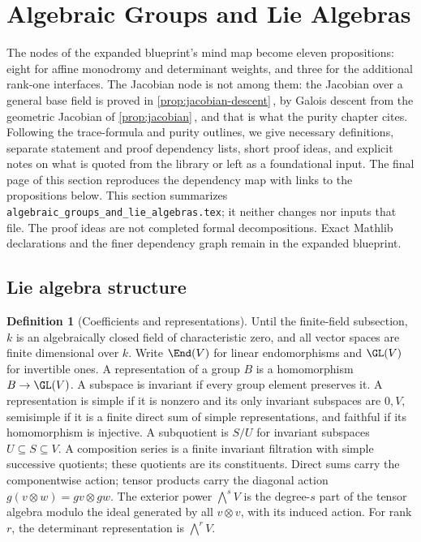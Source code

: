 \documentclass[11pt]{article}
\theoremstyle{plain}
\theoremstyle{definition}
\newtheorem{definition}[theorem]{Definition}
\newcommand{\Cref}[1]{\hyperref[#1]{\ref{#1}}\,\hyperref[#1]{\nameref*{#1}}}
\begin{document}
\section{Algebraic Groups and Lie Algebras}
\label{sec:algebraic-groups-lie-algebras}
\begin{abstract}
content: Lie algebra structure, algebraic monodromy, determinant weights,
and rank-one interfaces.
\\key results: the eleven map-node propositions below, from
Prop \ref{p:lie} to Prop \ref{p:rankone}; the remaining propositions are
the interfaces they rest on.
\\references: detailed blueprint
\end{abstract}

The nodes of the expanded blueprint's mind map become eleven
propositions: eight for affine monodromy and determinant weights, and
three for the additional rank-one interfaces. The Jacobian node is not
among them: the Jacobian over a general base field is proved in
\Cref{prop:jacobian-descent}, by Galois descent from the geometric
Jacobian of \Cref{prop:jacobian}, and that is what the purity chapter cites. Following the trace-formula
and purity outlines, we give necessary definitions, separate statement
and proof dependency lists, short proof ideas, and explicit notes on what
is quoted from the library or left as a foundational input. The final page of this section reproduces the dependency map with links to the
propositions below. This section summarizes
\texttt{algebraic\_groups\_and\_lie\_algebras.tex}; it neither changes
nor inputs that file. The proof ideas are not completed formal
decompositions. Exact Mathlib declarations and the finer dependency
graph remain in the expanded blueprint.

\subsection{Lie algebra structure}

\begin{definition}[Coefficients and representations]\label{d:linear}
Until the finite-field subsection, $k$ is an algebraically closed field of
characteristic zero, and all vector spaces are finite dimensional over
$k$. Write $\End(V)$ for linear endomorphisms and $\GL(V)$ for invertible
ones. A representation of a group $B$ is a homomorphism
$B\to\GL(V)$. A subspace is invariant if every group element preserves
it. A representation is simple if it is nonzero and its only invariant
subspaces are $0,V$, semisimple if it is a finite direct sum of simple
representations, and faithful if its homomorphism is injective.
A subquotient is $S/U$ for invariant subspaces $U\subseteq S\subseteq V$.
A composition series is a finite invariant filtration with simple
successive quotients; these quotients are its constituents.
Direct sums carry the componentwise action; tensor products carry the
diagonal action $g(v\otimes w)=gv\otimes gw$. The exterior power
$\bigwedge^s V$ is the degree-$s$ part of the tensor algebra modulo the
ideal generated by all $v\otimes v$, with its induced action.
For rank $r$, the determinant representation is $\bigwedge^r V$.
\end{definition}
\end{document}
